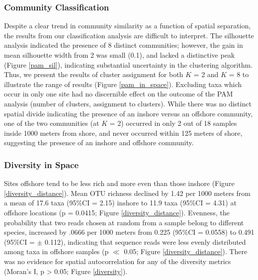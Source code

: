 \documentclass[11pt,letterpaper]{article} %
\begin{document}
\subsubsection*{Community Classification}
Despite a clear trend in community similarity as a function of spatial separation, the results from our classification analysis are difficult to interpret. The silhouette analysis indicated the presence of 8 distinct communities; however, the gain in mean silhouette width from 2 was small (0.1), and lacked a distinctive peak (Figure \ref{pam_sil}), indicating substantial uncertainty in the clustering algorithm. Thus, we present the results of cluster assignment for both $K$ = 2 and $K$ = 8 to illustrate the range of results (Figure \ref{pam_in_space}). Excluding taxa which occur in only one site had no discernible effect on the outcome of the PAM analysis (number of clusters, assignment to clusters). While there was no distinct spatial divide indicating the presence of an inshore versus an offshore community, one of the two communities (at $K$ = 2) occurred in only 2 out of 18 samples inside 1000 meters from shore, and never occurred within 125 meters of shore, suggesting the presence of an inshore and offshore community.

\subsubsection*{Diversity in Space}
Sites offshore tend to be less rich and more even than those inshore (Figure \ref{diversity_distance}). Mean OTU richness declined by 1.42 per 1000 meters from a mean of 17.6 taxa (95\%CI = 2.15) inshore to 11.9 taxa (95\%CI = 4.31) at offshore locations (p = 0.0415; Figure \ref{diversity_distance}). Evenness, the probability that two reads chosen at random from a sample belong to different species, increased by .0666 per 1000 meters from 0.225 (95\%CI = 0.0558) to 0.491 (95\%CI = $\pm$ 0.112), indicating that sequence reads were less evenly distributed among taxa in offshore samples (p $\ll$ 0.05; Figure \ref{diversity_distance}). There was no evidence for spatial autocorrelation for any of the diversity metrics (Moran's I, p > 0.05; Figure \ref{diversity}).
\end{document}
